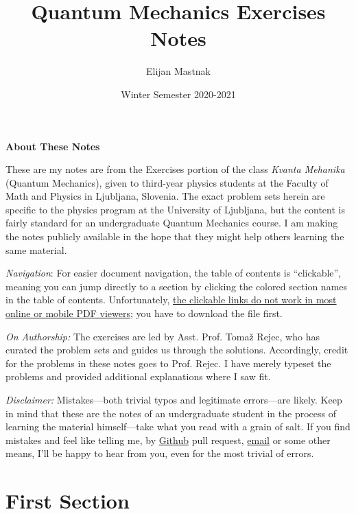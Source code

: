 \documentclass[11pt, a4paper]{article}
\begin{document}
\title{Quantum Mechanics Exercises Notes}
\author{Elijan Mastnak}
\date{Winter Semester 2020-2021}
\maketitle


\begin{center}
\textbf{About These Notes}
\end{center}

These are my notes are from the Exercises portion of the class \textit{Kvanta Mehanika} (Quantum Mechanics), given to third-year physics students at the Faculty of Math and Physics in Ljubljana, Slovenia. The exact problem sets herein are specific to the physics program at the University of Ljubljana, but the content is fairly standard for an undergraduate Quantum Mechanics course. I am making the notes publicly available in the hope that they might help others learning the same material.

\vspace{2mm}
\textit{Navigation}: For easier document navigation, the table of contents is ``clickable'', meaning you can jump directly to a section by clicking the colored section names in the table of contents. Unfortunately, \uline{the clickable links do not work in most online or mobile PDF viewers}; you have to download the file first.

\vspace{2mm}
\textit{On Authorship:} 
The exercises are led by Asst. Prof. Toma\v{z} Rejec, who has curated the problem sets and guides us through the solutions. Accordingly, credit for the problems in these notes goes to Prof. Rejec. I have merely typeset the problems and provided additional explanations where I saw fit.

\vspace{2mm}
\textit{Disclaimer:} Mistakes---both trivial typos and legitimate errors---are likely. Keep in mind that these are the notes of an undergraduate student in the process of learning the material himself---take what you read with a grain of salt. If you find mistakes and feel like telling me, by \href{https://github.com/ejmastnak/fmf}{Github} pull request, \href{mailto:ejmastnak@gmail.com}{email} or some other means, I'll be happy to hear from you, even for the most trivial of errors.


\tableofcontents

\newpage

\section{First Section}
\end{document}
